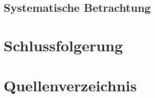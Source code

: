 \documentclass[a4paper,12pt]{article}
\begin{document}
    \subsection{Systematische Betrachtung}


    \section{Schlussfolgerung}


    \section{Quellenverzeichnis}

    \printbibliography[heading=none]
\end{document}

